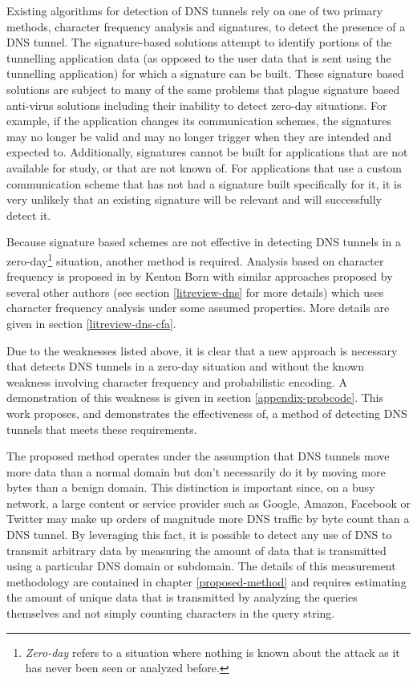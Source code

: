 \documentclass[12pt]{report}
\theoremstyle{remark}
\theoremstyle{definition}
\theoremstyle{definition}
\theoremstyle{definition}
\begin{document}
Existing algorithms for detection of DNS tunnels rely on one of two primary
methods, character frequency analysis and signatures, to detect the presence of
a DNS tunnel. The signature-based solutions attempt to identify portions of the
tunnelling application data (as opposed to the user data that is sent using the
tunnelling application) for which a signature can be built. These signature
based solutions are subject to many of the same problems that plague signature
based anti-virus solutions including their inability to detect zero-day
situations. For example, if the application changes its communication schemes,
the signatures may no longer be valid and may no longer trigger when they are
intended and expected to. Additionally, signatures cannot be built for
applications that are not available for study, or that are not known of. For
applications that use a custom communication scheme that has not had a signature
built specifically for it, it is very unlikely that an existing signature will
be relevant and will successfully detect it.

Because signature based schemes are not effective in detecting DNS tunnels in a
zero-day\footnote{\emph{Zero-day} refers to a situation where nothing is known
about the attack as it has never been seen or analyzed before.} situation,
another method is required. Analysis based on character frequency is proposed
in\cite{Born2010.cfa} by Kenton Born with similar approaches proposed by several
other authors (see section \ref{litreview-dns} for more details) which uses
character frequency analysis under some assumed properties. More details are
given in section \ref{litreview-dns-cfa}.

Due to the weaknesses listed above, it is clear that a new approach is necessary
that detects DNS tunnels in a zero-day situation and without the known weakness
involving character frequency and probabilistic encoding. A demonstration of
this weakness is given in section \ref{appendix-probcode}. This work proposes,
and demonstrates the effectiveness of, a method of detecting DNS tunnels that
meets these requirements.

The proposed method operates under the assumption that DNS tunnels move more
data than a normal domain but don't necessarily do it by moving more bytes than
a benign domain. This distinction is important since, on a busy network, a large
content or service provider such as Google, Amazon, Facebook or Twitter may make
up orders of magnitude more DNS traffic by byte count than a DNS tunnel. By
leveraging this fact, it is possible to detect any use of DNS to transmit
arbitrary data by measuring the amount of data that is transmitted using a
particular DNS domain or subdomain. The details of this measurement methodology
are contained in chapter \ref{proposed-method} and requires estimating the
amount of unique data that is transmitted by analyzing the queries themselves
and not simply counting characters in the query string.
\end{document}
